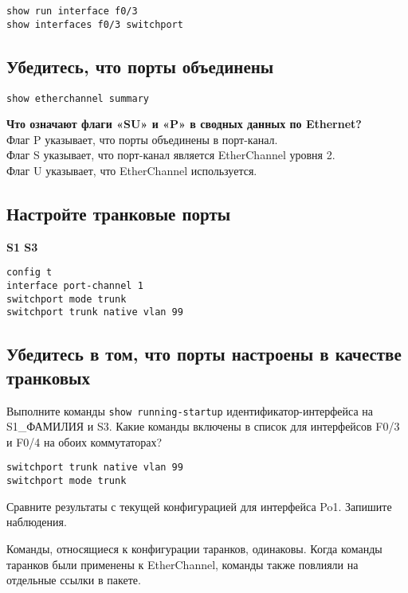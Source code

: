 \begin{verbatim}
show run interface f0/3
show interfaces f0/3 switchport
\end{verbatim}

\subsection{Убедитесь, что порты объединены}

\begin{verbatim}
show etherchannel summary
\end{verbatim}

\textbf{Что означают флаги «SU» и «P» в сводных данных по Ethernet?}\\
Флаг P указывает, что порты объединены в порт-канал.\\
Флаг S указывает, что порт-канал является EtherChannel уровня 2.\\
Флаг U указывает, что EtherChannel используется.\\

\subsection{Настройте транковые порты}

\textbf{S1 S3}

\begin{verbatim}
config t
interface port-channel 1
switchport mode trunk
switchport trunk native vlan 99
\end{verbatim}

\subsection{Убедитесь в том, что порты настроены в качестве транковых}

Выполните команды \verb|show running-startup| идентификатор-интерфейса
на S1\_ФАМИЛИЯ и S3.
Какие команды включены в список для интерфейсов F0/3 и F0/4
на обоих коммутаторах?

\begin{verbatim}
switchport trunk native vlan 99
switchport mode trunk
\end{verbatim}

Сравните результаты с текущей конфигурацией для интерфейса Po1.
Запишите наблюдения.

Команды, относящиеся к конфигурации таранков, одинаковы.
Когда команды таранков были применены к EtherChannel,
команды также повлияли на отдельные ссылки в пакете.

